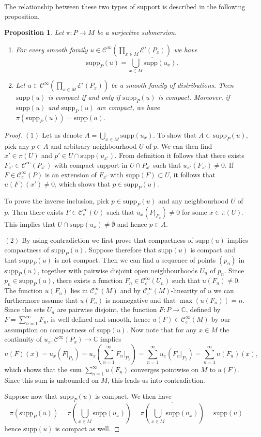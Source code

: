 \documentclass[a4paper]{amsart}
\newtheorem{prop}[dfn]{Proposition}
\newcommand{\CC}{\mathbb{C}}
\newcommand{\cE}{\mathcal{E}}
\newcommand{\supp}{\mathord{\mathrm{supp}}}
\newcommand{\C}{\mathord{\mathcal{C}^{\infty}}}
\newcommand{\Cc}{\mathord{\mathcal{C}^{\infty}_{c}}}
\begin{document}
The relationship between these two types of support is described in the following proposition.
\begin{prop}
Let $\pi:P\to M$ be a surjective submersion.
\begin{enumerate}
\item For every smooth family $u\in\C(\prod_{x\in M}\cE'(P_{x}))$ we have
\[
\supp_{P}(u)=\overline{\bigcup_{x\in M}\supp(u_{x})}.
\]
\item Let $u\in\C(\prod_{x\in M}\cE'(P_{x}))$ be a smooth family of distributions. Then $\supp(u)$ is compact if and only if $\supp_{P}(u)$ is compact.
Moreover, if $\supp(u)$ and $\supp_{P}(u)$ are compact, we have $\pi(\supp_{P}(u))=\supp(u)$.
\end{enumerate}
\end{prop}
\begin{proof}
$(1)$ Let us denote $A=\overline{\bigcup_{x\in M}\supp(u_{x})}$. To show that $A\subset\supp_{P}(u)$, pick any $p\in A$ and arbitrary
neighbourhood $U$ of $p$. We can then find $x'\in\pi(U)$ and $p'\in U\cap\supp(u_{x'})$. From definition it follows that there exists
$F_{x'}\in\C(P_{x'})$ with compact support in $U\cap P_{x'}$ such that $u_{x'}(F_{x'})\neq 0$. If $F\in\Cc(P)$ is an extension of $F_{x'}$ with
$\supp(F)\subset U$, it follows that $u(F)(x')\neq 0$, which shows that $p\in\supp_{P}(u)$.

To prove the inverse inclusion, pick $p\in\supp_{P}(u)$ and any neighbourhood $U$ of $p$. Then there exists $F\in\Cc(U)$ such that
$u_{x}(F|_{P_{x}})\neq 0$ for some $x\in\pi(U)$. This implies that $U\cap\supp(u_{x})\neq\emptyset$ and hence $p\in A$.

$(2)$ By using contradiction we first prove that compactness of $\supp(u)$ implies compactness of $\supp_{P}(u)$. Suppose therefore that $\supp(u)$
is compact and that $\supp_{P}(u)$ is not compact. Then we can find a sequence of points $(p_{n})$ in $\supp_{P}(u)$, 
together with pairwise disjoint open neighbourhoods $U_{n}$ of $p_{n}$. 
Since $p_{n}\in\supp_{P}(u)$, there exists a function $F_{n}\in\Cc(U_{n})$ such that $u(F_{n})\neq 0$. The function $u(F_{n})$ lies in 
$\Cc(M)$ and by $\Cc(M)$-linearity of $u$ we
can furthermore assume that $u(F_{n})$ is nonnegative and that $\max(u(F_{n}))=n$.
Since the sets $U_{n}$ are pairwise disjoint, the function $F:P\to\CC$, defined by $F=\sum_{n=1}^{\infty}F_{n}$, is well defined and smooth, hence
$u(F)\in\Cc(M)$ by our assumption on compactness of $\supp(u)$. Now note that for any $x\in M$ the continuity of $u_{x}:\C(P_{x})\to\CC$ implies
\[
u(F)(x)=u_{x}(F|_{P_{x}})=u_{x}\left(\sum_{n=1}^{\infty}F_{n}|_{P_{x}}\right)=\sum_{n=1}^{\infty}u_{x}(F_{n}|_{P_{x}})
=\sum_{n=1}^{\infty}u(F_{n})(x),
\]
which shows that the sum $\sum_{n=1}^{\infty}u(F_{n})$ converges pointwise on $M$ to $u(F)$. Since this sum is unbounded on $M$,
this leads us into contradiction.

Suppose now that $\supp_{P}(u)$ is compact. We then have
\[
\pi(\supp_{P}(u))=\pi\left(\overline{\bigcup_{x\in M}\supp(u_{x})}\right)
=\overline{\pi\left(\bigcup_{x\in M}\supp(u_{x})\right)}=\supp(u)
\]
hence $\supp(u)$ is compact as well.
\end{proof}
\end{document}
